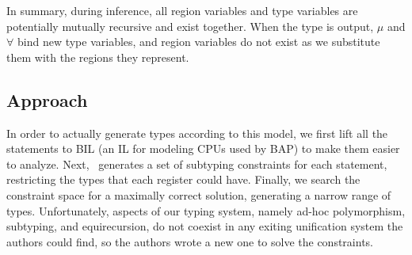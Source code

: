 In summary, during inference, all region variables and type variables are potentially mutually recursive and exist together. When the type is output, $\mu$ and $\forall$ bind new type variables, and region variables do not exist as we substitute them with the regions they represent.

\subsection{Approach}
In order to actually generate types according to this model, we first lift all the statements to BIL\cite{bap} (an IL for modeling CPUs used by BAP) to make them easier to analyze. Next, \bitr\ generates a set of subtyping constraints for each statement, restricting the types that each register could have. Finally, we search the constraint space for a maximally correct solution, generating a narrow range of types. Unfortunately, aspects of our typing system, namely ad-hoc polymorphism, subtyping, and equirecursion, do not coexist in any exiting unification system the authors could find, so the authors wrote a new one to solve the constraints.
